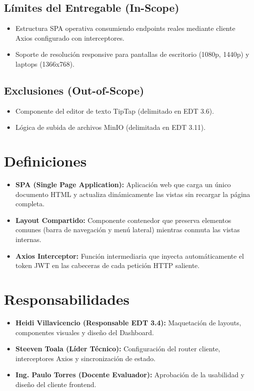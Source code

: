 \documentclass[12pt,a4paper]{article}
\begin{document}
\subsection{Límites del Entregable (In-Scope)}
\begin{itemize}[leftmargin=1.5em, itemsep=2pt]
    \item Estructura SPA operativa consumiendo endpoints reales mediante cliente Axios configurado con interceptores.
    \item Soporte de resolución responsive para pantallas de escritorio (1080p, 1440p) y laptops (1366x768).
\end{itemize}
\subsection{Exclusiones (Out-of-Scope)}
\begin{itemize}[leftmargin=1.5em, itemsep=2pt]
    \item Componente del editor de texto TipTap (delimitado en EDT 3.6).
    \item Lógica de subida de archivos MinIO (delimitada en EDT 3.11).
\end{itemize}

\section{Definiciones}
\begin{itemize}[leftmargin=1.5em, itemsep=2pt]
    \item \textbf{SPA (Single Page Application):} Aplicación web que carga un único documento HTML y actualiza dinámicamente las vistas sin recargar la página completa.
    \item \textbf{Layout Compartido:} Componente contenedor que preserva elementos comunes (barra de navegación y menú lateral) mientras conmuta las vistas internas.
    \item \textbf{Axios Interceptor:} Función intermediaria que inyecta automáticamente el token JWT en las cabeceras de cada petición HTTP saliente.
\end{itemize}

\section{Responsabilidades}
\begin{itemize}[leftmargin=1.5em, itemsep=2pt]
    \item \textbf{Heidi Villavicencio (Responsable EDT 3.4):} Maquetación de layouts, componentes visuales y diseño del Dashboard.
    \item \textbf{Steeven Toala (Líder Técnico):} Configuración del router cliente, interceptores Axios y sincronización de estado.
    \item \textbf{Ing. Paulo Torres (Docente Evaluador):} Aprobación de la usabilidad y diseño del cliente frontend.
\end{itemize}
\end{document}
